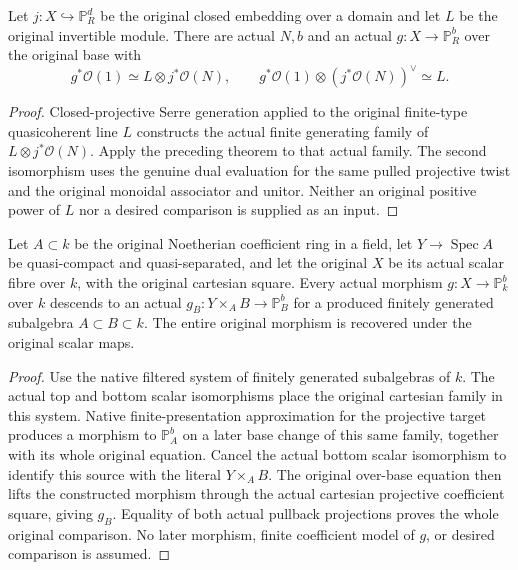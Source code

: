 \begin{theorem}
\label{thm:kn-arithmetic-original-line-expression}
\leanok
{}
Let $j:X\hookrightarrow\mathbb P^d_R$ be the original closed embedding
over a domain and let $L$ be the original invertible module.  There are
actual $N,b$ and an actual $g:X\to\mathbb P^b_R$ over the original base
with
\[
g^*\mathcal O(1)\simeq L\otimes j^*\mathcal O(N),\qquad
g^*\mathcal O(1)\otimes(j^*\mathcal O(N))^\vee\simeq L.
\]
\end{theorem}
\begin{proof}
Closed-projective Serre generation applied to the original finite-type
quasicoherent line $L$ constructs the actual finite generating family of
$L\otimes j^*\mathcal O(N)$.  Apply the preceding theorem to that actual
family.  The second isomorphism uses the genuine dual evaluation for the
same pulled projective twist and the original monoidal associator and
unitor.  Neither an original positive power of $L$ nor a desired comparison
is supplied as an input.
\end{proof}

\begin{theorem}
\label{thm:kn-arithmetic-original-line-descent}
\leanok
Let $A\subset k$ be the original Noetherian coefficient ring in a field,
let $Y\to\operatorname{Spec}A$ be quasi-compact and quasi-separated,
and let the original $X$ be its actual scalar fibre over $k$, with the
original cartesian square.  Every actual morphism $g:X\to\mathbb P^b_k$
over $k$ descends to an actual $g_B:Y\times_A B\to\mathbb P^b_B$ for
a produced finitely generated subalgebra $A\subset B\subset k$.
The entire original morphism is recovered under the original scalar maps.
\end{theorem}
\begin{proof}
Use the native filtered system of finitely generated subalgebras of $k$.
The actual top and bottom scalar isomorphisms place the original cartesian
family in this system.  Native finite-presentation approximation for the
projective target produces a morphism to $\mathbb P^b_A$ on a later base
change of this same family, together with its whole original equation.
Cancel the actual bottom scalar isomorphism to identify this source with
the literal $Y\times_A B$.  The original over-base equation then lifts
the constructed morphism through the actual cartesian projective
coefficient square, giving $g_B$.  Equality of both actual pullback
projections proves the whole original comparison.  No later morphism,
finite coefficient model of $g$, or desired comparison is assumed.
\end{proof}

